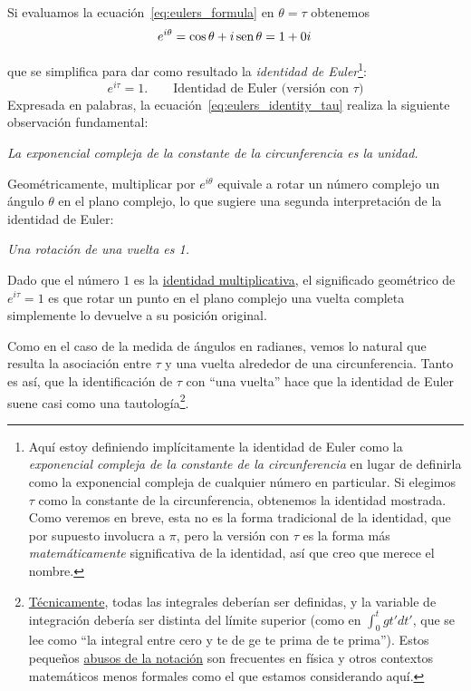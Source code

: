 Si evaluamos la ecuación~\eqref{eq:eulers_formula} en $\theta = \tau$ obtenemos 
\begin{equation}
\label{eq:eulers_formula_evaluated}
  e^{i\theta} = \cos\theta + i\,\mbox{sen}\,\theta = 1 + 0i\,
\end{equation}

que se simplifica para dar como resultado la \emph{identidad de Euler}\footnote{Aquí estoy definiendo implícitamente la identidad de Euler como la \emph{exponencial compleja de la constante de la circunferencia} en lugar de definirla como la exponencial compleja de cualquier número en particular. Si elegimos  $\tau$ como la constante de la circunferencia, obtenemos la identidad mostrada. Como veremos en breve, esta no es la forma tradicional de la identidad, que por supuesto involucra a $\pi$, pero la versión con  $\tau$ es la forma más  \emph{matemáticamente} significativa de la identidad, así que creo que merece el nombre.}:
\begin{equation}
\label{eq:eulers_identity_tau}
e^{i\tau} = 1. \qquad\mbox{Identidad de Euler (versión con $\tau$)}
\end{equation}
Expresada en palabras, la ecuación~\eqref{eq:eulers_identity_tau} realiza la siguiente observación fundamental:

\begin{center}
\emph{La exponencial compleja de la constante de la circunferencia es la unidad.} 
\end{center}

Geométricamente, multiplicar por $e^{i\theta}$ equivale a rotar un número complejo un ángulo $\theta$ en el plano complejo, lo que sugiere una segunda interpretación de la identidad de Euler:

\begin{center}
\emph{Una rotación de una vuelta es 1.}
\end{center}


\noindent Dado que el número $1$ es la \href{https://es.wikipedia.org/wiki/Elemento_neutro}{identidad multiplicativa}, el significado geométrico de $e^{i\tau} = 1$ es que rotar un punto en el plano complejo una vuelta completa simplemente lo devuelve a su posición original.

Como en el caso de la medida de ángulos en radianes, vemos lo natural que resulta la asociación entre $\tau$ y una vuelta alrededor de una circunferencia. Tanto es así, que la identificación de $\tau$ con ``una vuelta'' hace que la identidad de Euler suene casi como una tautología\footnote{\href{https://m.xkcd.com/1475/}{Técnicamente}, todas las integrales deberían ser definidas, y la variable de integración debería ser distinta del límite superior (como en $\int_0^t gt' dt'$, que se lee como ``la integral entre cero y te de ge te prima de te prima''). Estos pequeños \href{https://en.wikipedia.org/wiki/Abuse_of_notation}{abusos de la notación} son frecuentes en física y otros contextos matemáticos menos formales como el que estamos considerando aquí.}.


